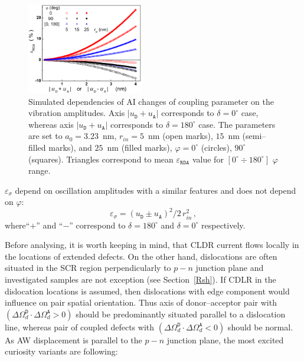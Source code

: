 \documentclass[aip,jap, amsmath,amssymb,reprint]{revtex4-1}
\begin{document}
\begin{figure}
\includegraphics[width=0.45\textwidth]{olikhFig5}%
\caption{\label{fig_Erda}
Simulated dependencies of AI changes of coupling parameter on the vibration amplitudes.
Axis $|u_\mathtt{D}+u_\mathtt{A}|$ corresponds to $\delta=0^\circ$ case, whereas axis $|u_\mathtt{D}+u_\mathtt{A}|$ corresponds to $\delta=180^\circ$ case.
The parameters are set to $a_0=3.23$~nm,
$r_{in}=5$~nm (open marks), $15$~nm (semi--filled marks), and $25$~nm (filled marks),
$\varphi=0^\circ$ (circles), $90^\circ$ (squares).
Triangles correspond to mean $\varepsilon_{\mathtt{RDA}}$ value for $[0^\circ\div 180^\circ]$ $\varphi$ range.
}%
\end{figure}

$\varepsilon_{\sigma}$ depend on oscillation amplitudes with a similar features and
does not depend on $\varphi$:
\begin{equation}
\label{eqEpsSig}
\varepsilon_{\sigma}=(u_\mathtt{D}\pm u_\mathtt{A})^2/2\,r_{in}^2\,,
\end{equation}
where``$+$'' and ``$-$'' correspond to $\delta=180^\circ$ and $\delta=0^\circ$ respectively.

Before analysing, it is worth keeping in mind, that
CLDR current flows locally in the locations of extended defects\cite{CDLR:JAP,CDLR:SSP}.
On the other hand, dislocations are often situated in the SCR region perpendicularly to $p-n$ junction plane
and investigated samples are not exception (see Section~\ref{Rsh}).
If CDLR in the dislocation locations is assumed, then dislocations with edge component would influence on pair spatial orientation.
Thus axis of donor--acceptor pair with $(\Delta\Omega_d^\mathtt{D}\cdot\Delta\Omega_d^\mathtt{A}>0)$  should be predominantly situated parallel to a dislocation line,
whereas pair of coupled defects with $(\Delta\Omega_d^\mathtt{D}\cdot\Delta\Omega_d^\mathtt{A}<0)$ should be normal.
As AW displacement is parallel to the $p-n$ junction plane,
the most excited curiosity variants are following:
\end{document}
